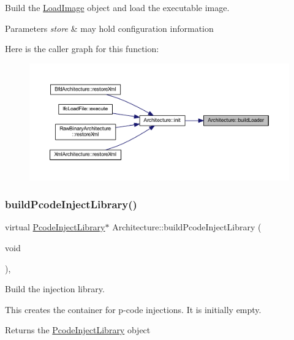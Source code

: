 Build the \mbox{\hyperlink{class_load_image}{Load\+Image}} object and load the executable image. 


\begin{DoxyParams}{Parameters}
{\em store} & may hold configuration information \\
\hline
\end{DoxyParams}
Here is the caller graph for this function\+:
\nopagebreak
\begin{figure}[H]
\begin{center}
\leavevmode
\includegraphics[width=350pt]{class_architecture_a9a19e1f07ba0449dfb21d3388b0dbc33_icgraph}
\end{center}
\end{figure}
\mbox{\label{class_architecture_a7dae4f59e2c196a623b45e68cacc1a7a}} 
\subsubsection{\texorpdfstring{buildPcodeInjectLibrary()}{buildPcodeInjectLibrary()}}
{\footnotesize\ttfamily virtual \mbox{\hyperlink{class_pcode_inject_library}{Pcode\+Inject\+Library}}$\ast$ Architecture\+::build\+Pcode\+Inject\+Library (\begin{DoxyParamCaption}\item[{void}]{ }\end{DoxyParamCaption})\hspace{0.3cm}{\ttfamily [protected]}, {}}



Build the injection library. 

This creates the container for p-\/code injections. It is initially empty. \begin{DoxyReturn}{Returns}
the \mbox{\hyperlink{class_pcode_inject_library}{Pcode\+Inject\+Library}} object 
\end{DoxyReturn}


